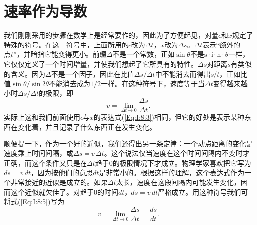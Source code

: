 \documentclass[12pt,oneside]{book}
\begin{document}
\section{速率作为导数}
我们刚刚采用的步骤在数学上是经常要作的，因此为了方便起见，对量$\epsilon$和$x$规定了特殊的符号。在这一符号中，上面所用的$\epsilon$改为$\Delta t$，$x$改为$\Delta s$。$\Delta t$表示“额外的一点$t$”，并暗指它能变得更小。前缀$\Delta$不是一个常数，正如$\sin \theta$不是$\text{s}\cdot\text{i}\cdot\text{n}\cdot\theta$一样，它仅仅定义了一个时间增量，并使我们想起了它所具有的特性。$\Delta s$对距离$s$有类似的含义。因为$\Delta$不是一个因子，因此在比值$\Delta s/\Delta t$中不能消去而得出$s/t$，正如比值$\sin\theta/\sin2\theta$不能消去成为$1/2$一样。在这种符号下，速度等于当$\Delta t$变得越来越小时$\Delta s/\Delta t$的极限，即
\begin{equation}
\label{Eq:I:8:5}
v=\lim_{\Delta t\to0}\frac{\Delta s}{\Delta t}.
\end{equation}
实际上这和我们前面使用$\epsilon$与$x$的表达式(\ref{Eq:I:8:3})相同，但它的好处是表示某种东西在变化着，并且记录了什么东西正在发生变化。

顺便提一下，作为一个好的近似，我们还得出另一条定律：一个动点距离的变化是速度乘上时间间隔，或$\Delta s=v\,\Delta t$。这个说法仅当速度在这个时间间隔内不变时才正确，而这个条件又只是在$\Delta t$趋于0的极限情况下才成立。物理学家喜欢把它写为$ds=v\,dt$，因为按他们的意思$dt$是非常小的。根据这样的理解，这个表达式作为一个非常接近的近似是成立的。如果$\Delta t$太长，速度在这段间隔内可能发生变化，因而这个近似就欠佳了。对趋于0的时间$dt$，$ds=v\,dt$严格成立。用这种符号我们可将式(\ref{Eq:I:8:5})写为
\begin{equation*}
v=\lim_{\Delta t\to0}\frac{\Delta s}{\Delta t}=\frac{ds}{dt}.
\end{equation*}
\end{document}
